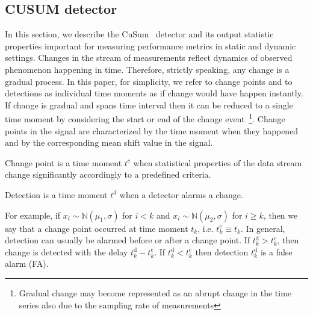 \subsection{CUSUM detector}

In this section, we describe the CuSum~\cite{Page1954} detector and its output statistic properties important for measuring performance metrics in static and dynamic settings.
Changes in the stream of measurements reflect dynamics of observed phenomenon happening in time.
Therefore, strictly speaking, any change is a gradual process.
In this paper, for simplicity, we refer to change points and to detections as individual time moments as if change would have happen instantly. If change is gradual and spans time interval then it can be reduced to a single time moment by considering the start or end of the change event~\footnote{Gradual change may become represented as an abrupt change in the time series also due to the sampling rate of measurements}.
Change points in the signal are characterized by the time moment when they happened and by the corresponding mean shift value in the signal.
\begin{definition}
	Change point is a time moment $t^c$ when statistical properties of the data stream change significantly accordingly to a predefined criteria.
\end{definition}
\begin{definition}
	Detection is a time moment $t^d$ when a detector alarms a change.
\end{definition}
For example, if $x_i \sim \mathbb{N}(\mu_1, \sigma)$ for $i < k$ and $x_i \sim \mathbb{N}(\mu_2, \sigma)$ for $i \geq k$,
then we say that a change point occurred at time moment $t_k$, i.e. $t^{\text{c}}_{k} \equiv t_k$.
In general, detection can usually be alarmed before or after a change point.
If $t^{\text{d}}_k > t^{\text{c}}_k$, then change is detected with the delay $t^{\text{d}}_k - t^{\text{c}}_k$.
If $t^{\text{d}}_k < t^{\text{c}}_k$ then detection $t^{\text{d}}_k$ is a false alarm (FA).

